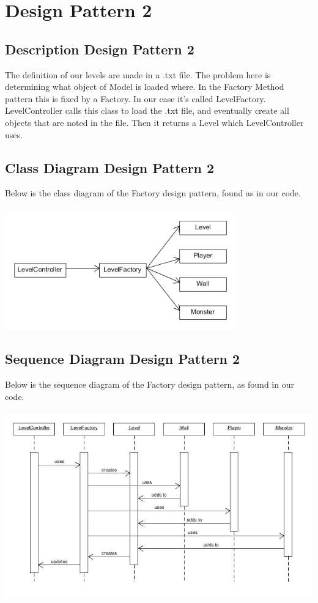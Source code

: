 \section{Design Pattern 2}

\subsection{Description Design Pattern 2}
The definition of our levels are made in a .txt file. The problem here is determining what object of Model is loaded where. In the Factory Method pattern this is fixed by a Factory. In our case it's called LevelFactory. LevelController calls this class to load the .txt file, and eventually create all objects that are noted in the file. Then it returns a Level which LevelController uses.


\subsection{Class Diagram Design Pattern 2}

Below is the class diagram of the Factory design pattern, found as in our code.
\\\\
\includegraphics[width=100mm]{UML_factory.png}

\subsection{Sequence Diagram Design Pattern 2}

Below is the sequence diagram of the Factory design pattern, as found in our code.
\\\\
\includegraphics[width=150mm]{factory_sequence.jpg}